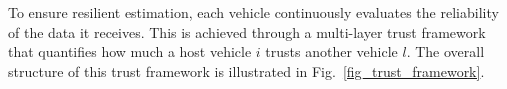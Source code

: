 \documentclass{ifacconf}
\def\eqref#1{(\ref{#1})}
\def\N{\mathcal{N}} %
\def\LO{\mathcal{LO}} %
\def\DO{\mathcal{DO}} %
\begin{document}
To ensure resilient estimation, each vehicle continuously evaluates the reliability of the data it receives.
This is achieved through a multi-layer trust framework that quantifies how much a host vehicle $i$ trusts another vehicle $l$. The overall structure of this trust framework is illustrated in Fig.~\ref{fig_trust_framework}.
\end{document}
